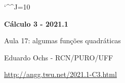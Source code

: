 \documentclass[oneside,12pt]{article}
\begin{document}
\catcode`\^^J=10

\pu


%
%

\def\thompsonpage#1{{\scriptsize
\url{https://www.gutenberg.org/files/33283/33283-pdf.pdf\#page=#1}
}}

\def\pictgray#1{{\color{GrayPale}\linethickness{0.3pt}#1}}

\def\drafturl{http://angg.twu.net/LATEX/2021-1-C3.pdf}
\def\drafturl{http://angg.twu.net/2021.1-C3.html}
\def\draftfooter{\tiny \href{\drafturl}{\jobname{}} \ColorBrown{\shorttoday{} \hours}}




%

\thispagestyle{empty}

\begin{center}

\vspace*{1.2cm}

{\bf \Large Cálculo 3 - 2021.1}

\bsk

Aula 17: algumas funções quadráticas

\bsk

Eduardo Ochs - RCN/PURO/UFF

\url{http://angg.twu.net/2021.1-C3.html}

\end{center}
\end{document}
